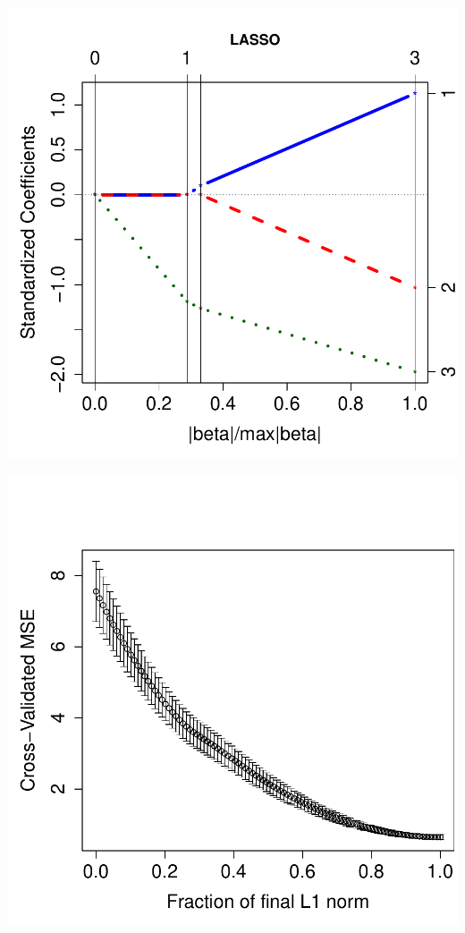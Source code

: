 \documentclass[a4paper]{article}
\begin{document}
\begin{minipage}[c]{0.6\linewidth}
\includegraphics{h4_ind-003}
\end{minipage}
\hspace{-50pt}
\begin{minipage}[c]{0.6\linewidth}
\includegraphics{h4_ind-004}
\end{minipage}
\end{document}
